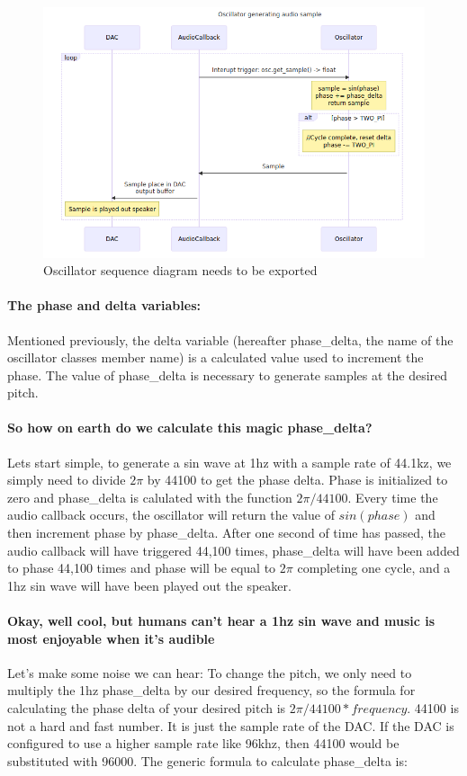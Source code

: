 \documentclass[acmlarge,screen]{acmart}
\begin{document}
	\begin{figure}
		\includegraphics[width=\linewidth]{oscillator_sequence_diagram}
		\caption{Oscillator sequence diagram needs to be exported}
		\centering
	\end{figure}
	
	\paragraph{The phase and delta variables:} Mentioned previously, the delta variable (hereafter phase\_delta, the name of the oscillator classes member name) is a calculated value used to increment the phase. The value of phase\_delta is necessary to generate samples at the desired pitch.
	\paragraph{So how on earth do we calculate this magic phase\_delta?} Lets start simple, to generate a sin wave at 1hz with a sample rate of 44.1kz, we simply need to divide \( 2\pi \) by 44100 to get the phase delta. Phase is initialized to zero and phase\_delta is calulated with the function \( 2\pi/44100 \). Every time the audio callback occurs, the oscillator will return the value of \( sin(phase) \) and then increment phase by phase\_delta. After one second of time has passed, the audio callback will have triggered 44,100 times, phase\_delta will have been added to phase 44,100 times and phase will be equal to \( 2\pi \) completing one cycle, and a 1hz sin wave will have been played out the speaker. 
	
	\paragraph{Okay, well cool, but humans can't hear a 1hz sin wave and music is most enjoyable when it's audible} Let's make some noise we can hear: To change the pitch, we only need to multiply the 1hz phase\_delta by our desired frequency, so the formula for calculating the phase delta of your desired pitch is \( 2\pi/44100 * frequency \). 44100 is not a hard and fast number. It is just the sample rate of the DAC. If the DAC is configured to use a higher sample rate like 96khz, then 44100 would be substituted with 96000. The generic formula to calculate phase\_delta is: 
	
\end{document}
